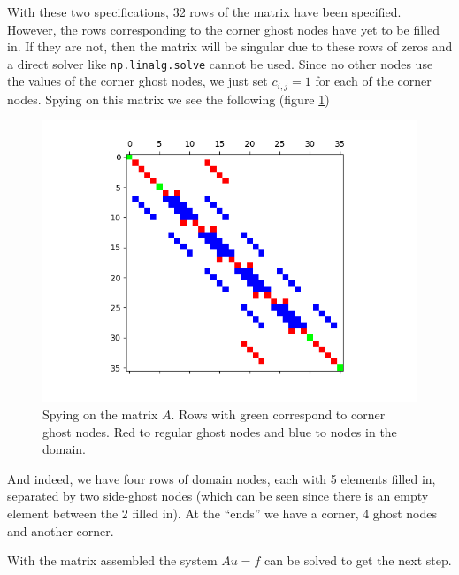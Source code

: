 \documentclass[sigconf]{acmart}
\begin{document}
With these two specifications, 32 rows of the matrix have been specified. However, the rows corresponding to the corner ghost nodes have yet to be filled in. If they are not, then the matrix will be singular due to these rows of zeros and a direct solver like \texttt{np.linalg.solve} cannot be used. Since no other nodes use the values of the corner ghost nodes, we just set $ c_{i,j} = 1 $ for each of the corner nodes. Spying on this matrix we see the following (figure \ref{fig:spy})
\begin{figure}
	\centering
	\includegraphics[width=\linewidth]{spy.png}
	\caption{Spying on the matrix $ A $. Rows with green correspond to corner ghost nodes. Red to regular ghost nodes and blue to nodes in the domain.}
	\label{fig:spy}
\end{figure}
And indeed, we have four rows of domain nodes, each with 5 elements filled in, separated by two side-ghost nodes (which can be seen since there is an empty element between the 2 filled in). At the ``ends'' we have a corner, 4 ghost nodes and another corner.

With the matrix assembled the system $ Au=f $ can be solved to get the next step.
\end{document}
